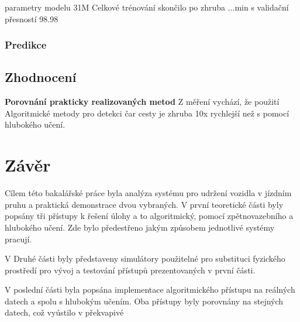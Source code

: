 \documentclass[czech, bc, kky, he, iso690numb]{fasthesis}
\begin{document}
        		parametry modelu 31M
        		Celkové trénování skončilo po zhruba ...min s validační přesností 98.98%
        	\subsection{Predikce}
        \section{Zhodnocení}
        	\textbf{Porovnání prakticky realizovaných metod}
        	Z měření vychází, že použití Algoritmické metody pro detekci čar cesty je zhruba 10x rychlejší než s pomocí hlubokého učení.
    \chapter{Závěr}
        Cílem této bakalářské práce byla analýza systému pro udržení vozidla v jízdním pruhu a praktická demonstrace dvou vybraných. V první teoretické části byly popsány tři přístupy k řešení úlohy a to algoritmický, pomocí zpětnovazebního a hlubokého učení. Zde bylo předestřeno jakým způsobem jednotlivé systémy pracují.
        
        V Druhé části byly představeny simulátory použitelné pro substituci fyzického prostředí pro vývoj a testování přístupů prezentovaných v první části.
        
        V poslední části byla popsána implementace algoritmického přístupu na reálných datech a spolu s hlubokým učením. Oba přístupy byly porovnány na stejných datech, což vyústilo v překvapivé
                    
    \backmatter
    \printbibliography
    \listoffigures
    \listoftables
    \listoflistings
    \backpage
\end{document}
